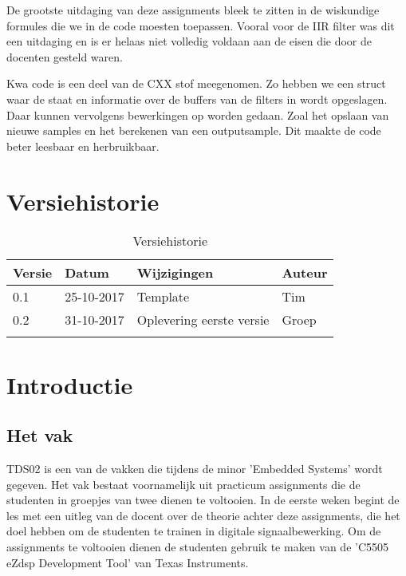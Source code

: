 \documentclass[11pt,a4paper]{article}
\begin{document}
De grootste uitdaging van deze assignments bleek te zitten in de wiskundige formules die we in de code moesten toepassen. Vooral voor de IIR filter was dit een uitdaging en is er helaas niet volledig voldaan aan de eisen die door de docenten gesteld waren. 

Kwa code is een deel van de CXX stof meegenomen. Zo hebben we een struct waar de staat en informatie over de buffers van de filters in wordt opgeslagen. Daar kunnen vervolgens bewerkingen op worden gedaan. Zoal het opslaan van nieuwe samples en het berekenen van een outputsample. Dit maakte de code beter leesbaar en herbruikbaar.
	 
	
		
	
	\clearpage
	
	\tableofcontents
	
	\clearpage
	
	\listoffigures
	
	\clearpage
	\listoftables
	
	\clearpage
	
	\section{Versiehistorie}
	\begin{table}[H]
		\centering
		\label{Versiehistorie}
		\begin{tabular}{|p{1cm}|p{2cm}|p{6cm}|p{2cm}|}
			\hline
			\rowcolor[HTML]{FFCC67}
			\textbf{Versie} & \textbf{Datum} & \textbf{Wijzigingen} & \textbf{Auteur} \\ \hline
			0.1    & 25-10-2017 & Template    & Tim \\ \hline
			0.2	   & 31-10-2017 & Oplevering eerste versie  & Groep \\ \hline
			&       &             &        \\ \hline
		\end{tabular}
		\caption {Versiehistorie} \label{tab:title} 
	\end{table}	


	\section{Introductie}
		\subsection{Het vak}
		TDS02 is een van de vakken die tijdens de minor 'Embedded Systems' wordt gegeven. Het vak bestaat voornamelijk uit practicum assignments die de studenten in groepjes van twee dienen te voltooien. In de eerste weken begint de les met een uitleg van de docent over de theorie achter deze assignments, die het doel hebben om de studenten te trainen in digitale signaalbewerking. Om de assignments te voltooien dienen de studenten gebruik te maken van de 'C5505 eZdsp Development Tool' van Texas Instruments.
		
\end{document}

